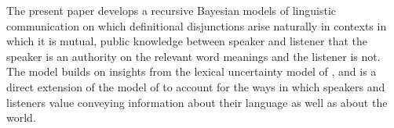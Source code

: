 The present paper develops a recursive Bayesian models of linguistic
communication \citep{Franke09DISS,Jaeger:2011,Frank:Goodman:2012} on
which definitional disjunctions arise naturally in contexts in which
it is mutual, public knowledge between speaker and listener that the
speaker is an authority on the relevant word meanings and the listener
is not.  The model builds on insights from the lexical uncertainty
model of \citet{Bergen:Goodman:Levy:2012}, and is a direct extension
of the model of \citet{Smith:Goodman:Frank:2013} to account for the
ways in which speakers and listeners value conveying information about
their language as well as about the world.

%


















